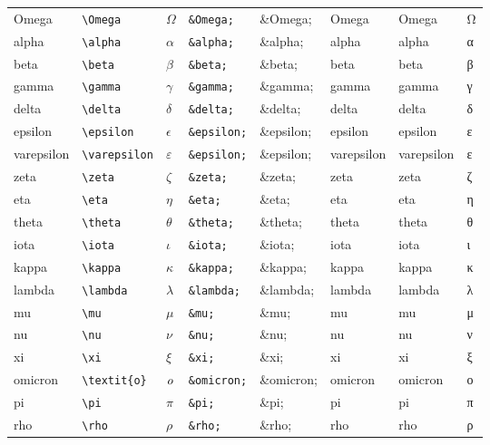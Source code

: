 \documentclass[11pt]{article}
\begin{document}
\begin{longtable}{llllllll}
Omega & \texttt{\textbackslash{}Omega} & $\Omega$ & \texttt{\&Omega;} & \&Omega; & Omega & Omega & Ω\\
alpha & \texttt{\textbackslash{}alpha} & $\alpha$ & \texttt{\&alpha;} & \&alpha; & alpha & alpha & α\\
beta & \texttt{\textbackslash{}beta} & $\beta$ & \texttt{\&beta;} & \&beta; & beta & beta & β\\
gamma & \texttt{\textbackslash{}gamma} & $\gamma$ & \texttt{\&gamma;} & \&gamma; & gamma & gamma & γ\\
delta & \texttt{\textbackslash{}delta} & $\delta$ & \texttt{\&delta;} & \&delta; & delta & delta & δ\\
epsilon & \texttt{\textbackslash{}epsilon} & $\epsilon$ & \texttt{\&epsilon;} & \&epsilon; & epsilon & epsilon & ε\\
varepsilon & \texttt{\textbackslash{}varepsilon} & $\varepsilon$ & \texttt{\&epsilon;} & \&epsilon; & varepsilon & varepsilon & ε\\
zeta & \texttt{\textbackslash{}zeta} & $\zeta$ & \texttt{\&zeta;} & \&zeta; & zeta & zeta & ζ\\
eta & \texttt{\textbackslash{}eta} & $\eta$ & \texttt{\&eta;} & \&eta; & eta & eta & η\\
theta & \texttt{\textbackslash{}theta} & $\theta$ & \texttt{\&theta;} & \&theta; & theta & theta & θ\\
iota & \texttt{\textbackslash{}iota} & $\iota$ & \texttt{\&iota;} & \&iota; & iota & iota & ι\\
kappa & \texttt{\textbackslash{}kappa} & $\kappa$ & \texttt{\&kappa;} & \&kappa; & kappa & kappa & κ\\
lambda & \texttt{\textbackslash{}lambda} & $\lambda$ & \texttt{\&lambda;} & \&lambda; & lambda & lambda & λ\\
mu & \texttt{\textbackslash{}mu} & $\mu$ & \texttt{\&mu;} & \&mu; & mu & mu & μ\\
nu & \texttt{\textbackslash{}nu} & $\nu$ & \texttt{\&nu;} & \&nu; & nu & nu & ν\\
xi & \texttt{\textbackslash{}xi} & $\xi$ & \texttt{\&xi;} & \&xi; & xi & xi & ξ\\
omicron & \texttt{\textbackslash{}textit\{o\}} & $\mbox{\textit{o}}$ & \texttt{\&omicron;} & \&omicron; & omicron & omicron & ο\\
pi & \texttt{\textbackslash{}pi} & $\pi$ & \texttt{\&pi;} & \&pi; & pi & pi & π\\
rho & \texttt{\textbackslash{}rho} & $\rho$ & \texttt{\&rho;} & \&rho; & rho & rho & ρ\\

\end{longtable}
\end{document}
